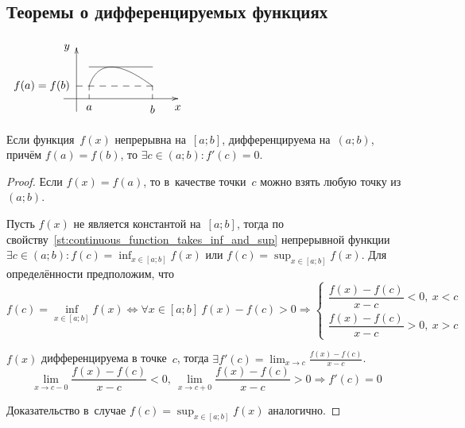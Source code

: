 \subsection{Теоремы о дифференцируемых функциях}
\begin{floatingfigure}[r]{58mm}
\noindent
$\begin{xy} /r8mm/:
(-0.5, 0); (4, 0) **@{-} *@{>} *++!U{x};
(0, -0.5); (0, 2) **@{-} *@{>} *++!R{y};
(0.5, 0.5) = "a"; (3, 0.5) = "b" **\crv{(1, 2)};
"a"; (0.5, 0) **@{--} *++!U{a};
"b"; (3, 0) **@{--} *++!U{b};
"b"; (0, 0.5) **@{--} *++!R{f(a) = f(b)};
(0.5, 1.2525); (3, 1.2525) **@{-};
\end{xy}$
\end{floatingfigure}
\begin{theorem}[Ролля]
Если функция~$f(x)$ непрерывна на~$[a; b]$, дифференцируема на~$(a; b)$, причём $f(a) = f(b)$, то $\exists c \in (a; b) \colon f'(c) = 0$.
\end{theorem}
\begin{proof}
Если $f(x) = f(a)$, то в~качестве точки~$c$ можно взять любую точку из~$(a; b)$.

Пусть $f(x)$ не является константой на~$[a; b]$, тогда по свойству~\ref{st:continuous_function_takes_inf_and_sup} непрерывной функции $\displaystyle \exists c \in (a; b) \colon f(c) = \inf_{x \in [a; b]} f(x)$ или $f(c) = \sup_{x \in [a; b]} f(x)$.
Для определённости предположим, что
\begin{equation*}
f(c) = \inf_{x \in [a; b]} f(x) \Leftrightarrow
\forall x \in [a; b] \ f(x) - f(c) > 0 \Rightarrow
\begin{cases}
\dfrac{f(x) - f(c)}{x - c} < 0, \ x < c \\
\dfrac{f(x) - f(c)}{x - c} > 0, \ x > c
\end{cases}
\end{equation*}

$f(x)$ дифференцируема в точке~$c$, тогда $\displaystyle \exists f'(c) = \lim_{x \to c} \frac{f(x) - f(c)}{x - c}$.
\begin{equation*}
\lim_{x \to c-0} \frac{f(x) - f(c)}{x - c} < 0, \
\lim_{x \to c+0} \frac{f(x) - f(c)}{x - c} > 0 \Rightarrow
f'(c) = 0
\end{equation*}

Доказательство в~случае $\displaystyle f(c) = \sup_{x \in [a; b]} f(x)$ аналогично.
\end{proof}

